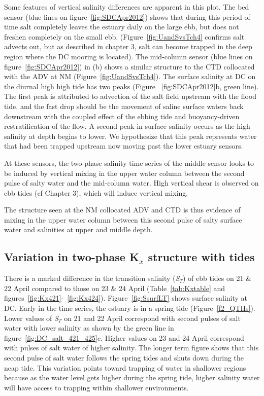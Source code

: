 Some features of vertical salinity differences are apparent in this plot. The bed sensor (blue lines on figure~\ref{fig:SDCApr2012}) shows that during this period of time salt completely leaves the estuary daily on the large ebb, but does not freshen completely on the small ebb. (Figure~\ref{fig:UandSvsTch4} confirms salt advects out, but as described in chapter 3, salt can become trapped in the deep region where the DC mooring is located). The mid-column sensor (blue lines on figure~\ref{fig:SDCApr2012}) in (b) shows a similar structure to the CTD collocated with the ADV at NM (Figure~\ref{fig:UandSvsTch4}). The surface salinity at DC on the diurnal high high tide has two peaks (Figure ~\ref{fig:SDCApr2012}b, green line). The first peak is attributed to advection of the salt field upstream with the flood tide, and the fast drop should be the movement of saline surface waters back downstream with the coupled effect of the ebbing tide and buoyancy-driven restratification of the flow. A second peak in surface salinity occurs as the high salinity at depth begins to lower. We hypothesize that this peak represents water that had been trapped upstream now moving past the lower estuary sensors. 

At these sensors, the two-phase salinity time series of the middle sensor looks to be induced by vertical mixing in the upper water column between the second pulse of salty water and the mid-column water. High vertical shear is observed on ebb tides (cf Chapter 3), which will induce vertical mixing. 

The structure seen at the NM collocated ADV and CTD is thus evidence of mixing in the upper water column between this second pulse of salty surface water and salinities at upper and middle depth.

\subsection{Variation in two-phase K$_x$ structure with tides}
There is a marked difference in the transition salinity (\emph{S$_T$}) of ebb tides on 21 \& 22 April compared to those on 23 \& 24 April (Table~\ref{tab:Kxtable} and figures~\ref{fig:Kx421}-~\ref{fig:Kx424}). Figure~\ref{fig:SsurfLT} shows surface salinity at DC. Early in the time series, the estuary is in a spring tide (Figure~\ref{f2_QTHs}). Lower values of \emph{S$_T$} on 21 and 22 April correspond with second pulses of salt water with lower salinity as shown by the green line in figure~\ref{fig:DC_salt_421_425}c. Higher values on 23 and 24 April correspond with pulses of salt water of higher salinity. The longer term figure shows that this second pulse of salt water follows the spring tides and shuts down during the neap tide. This variation points toward trapping of water in shallower regions because as the water level gets higher during the spring tide, higher salinity water will have access to trapping within shallower environments.

